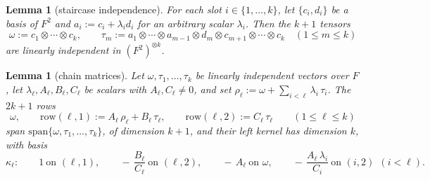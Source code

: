 \documentclass{article}
\newtheorem{lemma}[theorem]{Lemma}
\theoremstyle{definition}
\begin{document}
\begin{lemma}[staircase independence]\label{lem:staircase}
For each slot $i \in \{1, \dots, k\}$, let $\{c_i, d_i\}$ be a basis of $F^2$ and $a_i := c_i + \lambda_i d_i$ for an arbitrary scalar $\lambda_i$. Then the $k + 1$ tensors
\[
\omega := c_1 \otimes \cdots \otimes c_k , \qquad \tau_m := a_1 \otimes \cdots \otimes a_{m-1} \otimes d_m \otimes c_{m+1} \otimes \cdots \otimes c_k \quad (1 \leq m \leq k)
\]
are linearly independent in $(F^2)^{\otimes k}$.
\end{lemma}

\begin{lemma}[chain matrices]\label{lem:chain}
Let $\omega, \tau_1, \dots, \tau_k$ be linearly independent vectors over $F$, let $\lambda_\ell, A_\ell, B_\ell, C_\ell$ be scalars with $A_\ell, C_\ell \neq 0$, and set $\rho_\ell := \omega + \sum_{i < \ell} \lambda_i\, \tau_i$. The $2k + 1$ rows
\[
\omega , \qquad \mathrm{row}(\ell, 1) := A_\ell\, \rho_\ell + B_\ell\, \tau_\ell , \qquad \mathrm{row}(\ell, 2) := C_\ell\, \tau_\ell \qquad (1 \leq \ell \leq k)
\]
span $\mathrm{span}\{\omega, \tau_1, \dots, \tau_k\}$, of dimension $k + 1$, and their left kernel has dimension $k$, with basis
\[
\kappa_\ell : \qquad 1 \ \text{on } (\ell, 1) , \qquad -\,\frac{B_\ell}{C_\ell} \ \text{on } (\ell, 2) , \qquad -\,A_\ell \ \text{on } \omega , \qquad -\,\frac{A_\ell\, \lambda_i}{C_i} \ \text{on } (i, 2) \ \ (i < \ell) .
\]
\end{lemma}
\end{document}
